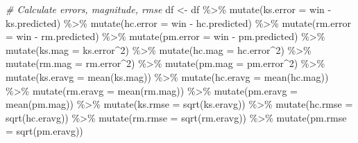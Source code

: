 \documentclass[
]{article}
\newenvironment{Shaded}{\begin{snugshade}}{\end{snugshade}}
\newcommand{\AttributeTok}[1]{\textcolor[rgb]{0.77,0.63,0.00}{#1}}
\newcommand{\CommentTok}[1]{\textcolor[rgb]{0.56,0.35,0.01}{\textit{#1}}}
\newcommand{\DecValTok}[1]{\textcolor[rgb]{0.00,0.00,0.81}{#1}}
\newcommand{\FunctionTok}[1]{\textcolor[rgb]{0.00,0.00,0.00}{#1}}
\newcommand{\NormalTok}[1]{#1}
\newcommand{\OtherTok}[1]{\textcolor[rgb]{0.56,0.35,0.01}{#1}}
\newcommand{\SpecialCharTok}[1]{\textcolor[rgb]{0.00,0.00,0.00}{#1}}
\begin{document}
\begin{Shaded}
\begin{Highlighting}[]
\CommentTok{\# Calculate errors, magnitude, rmse}
\NormalTok{df }\OtherTok{\textless{}{-}}\NormalTok{ df }\SpecialCharTok{\%\textgreater{}\%}
  \FunctionTok{mutate}\NormalTok{(}\AttributeTok{ks.error =}\NormalTok{ win }\SpecialCharTok{{-}}\NormalTok{ ks.predicted) }\SpecialCharTok{\%\textgreater{}\%} 
  \FunctionTok{mutate}\NormalTok{(}\AttributeTok{hc.error =}\NormalTok{ win }\SpecialCharTok{{-}}\NormalTok{ hc.predicted) }\SpecialCharTok{\%\textgreater{}\%} 
  \FunctionTok{mutate}\NormalTok{(}\AttributeTok{rm.error =}\NormalTok{ win }\SpecialCharTok{{-}}\NormalTok{ rm.predicted) }\SpecialCharTok{\%\textgreater{}\%} 
  \FunctionTok{mutate}\NormalTok{(}\AttributeTok{pm.error =}\NormalTok{ win }\SpecialCharTok{{-}}\NormalTok{ pm.predicted) }\SpecialCharTok{\%\textgreater{}\%} 
  \FunctionTok{mutate}\NormalTok{(}\AttributeTok{ks.mag =}\NormalTok{ ks.error}\SpecialCharTok{\^{}}\DecValTok{2}\NormalTok{) }\SpecialCharTok{\%\textgreater{}\%} 
  \FunctionTok{mutate}\NormalTok{(}\AttributeTok{hc.mag =}\NormalTok{ hc.error}\SpecialCharTok{\^{}}\DecValTok{2}\NormalTok{) }\SpecialCharTok{\%\textgreater{}\%} 
  \FunctionTok{mutate}\NormalTok{(}\AttributeTok{rm.mag =}\NormalTok{ rm.error}\SpecialCharTok{\^{}}\DecValTok{2}\NormalTok{) }\SpecialCharTok{\%\textgreater{}\%} 
  \FunctionTok{mutate}\NormalTok{(}\AttributeTok{pm.mag =}\NormalTok{ pm.error}\SpecialCharTok{\^{}}\DecValTok{2}\NormalTok{) }\SpecialCharTok{\%\textgreater{}\%} 
  \FunctionTok{mutate}\NormalTok{(}\AttributeTok{ks.eravg =} \FunctionTok{mean}\NormalTok{(ks.mag)) }\SpecialCharTok{\%\textgreater{}\%}
  \FunctionTok{mutate}\NormalTok{(}\AttributeTok{hc.eravg =} \FunctionTok{mean}\NormalTok{(hc.mag)) }\SpecialCharTok{\%\textgreater{}\%}
  \FunctionTok{mutate}\NormalTok{(}\AttributeTok{rm.eravg =} \FunctionTok{mean}\NormalTok{(rm.mag)) }\SpecialCharTok{\%\textgreater{}\%}
  \FunctionTok{mutate}\NormalTok{(}\AttributeTok{pm.eravg =} \FunctionTok{mean}\NormalTok{(pm.mag)) }\SpecialCharTok{\%\textgreater{}\%}
  \FunctionTok{mutate}\NormalTok{(}\AttributeTok{ks.rmse =} \FunctionTok{sqrt}\NormalTok{(ks.eravg)) }\SpecialCharTok{\%\textgreater{}\%}
  \FunctionTok{mutate}\NormalTok{(}\AttributeTok{hc.rmse =} \FunctionTok{sqrt}\NormalTok{(hc.eravg)) }\SpecialCharTok{\%\textgreater{}\%}
  \FunctionTok{mutate}\NormalTok{(}\AttributeTok{rm.rmse =} \FunctionTok{sqrt}\NormalTok{(rm.eravg)) }\SpecialCharTok{\%\textgreater{}\%}
  \FunctionTok{mutate}\NormalTok{(}\AttributeTok{pm.rmse =} \FunctionTok{sqrt}\NormalTok{(pm.eravg)) }
\end{Highlighting}
\end{Shaded}
\end{document}
